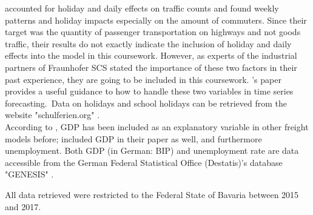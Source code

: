 \documentclass[a4paper, 11pt]{article}
\begin{document}
\cite{Cools.2009} accounted for holiday and daily effects on traffic counts and found weekly patterns and holiday impacts especially on the amount of commuters. Since their target was the quantity of passenger transportation on highways and not goods traffic, their results do not exactly indicate the inclusion of holiday and daily effects into the model in this coursework. However, as experts of the industrial partners of Fraunhofer SCS stated the importance of these two factors in their past experience, they are going to be included in this coursework. \cite{Cools.2009}'s paper provides a useful guidance to how to handle these two variables in time series forecasting.\
Data on holidays and school holidays can be retrieved from the website "schulferien.org" \citep{.b}.\\

According to \cite{JONG.2004}, GDP has been included as an explanatory variable in other freight models before; \cite{Intihar} included GDP in their paper as well, and furthermore unemployment. Both GDP (in German: BIP) and unemployment rate are data accessible from the German Federal Statistical Office (Destatis)'s database "GENESIS" \citep{StatistischesBundesamt.2019}.\


All data retrieved were restricted to the Federal State of Bavaria between 2015 and 2017.


\end{document}
